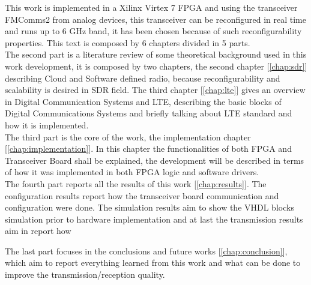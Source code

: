 This work is implemented in a Xilinx Virtex 7 FPGA and using the transceiver
FMComms2 from analog devices, this transceiver can be reconfigured in real time
and runs up to 6 GHz band, it has been chosen because of such reconfigurability
properties. This text is composed by 6 chapters divided in 5 parts.\\

The second part is a literature review of some theoretical background used in
this work development, it is composed by two chapters, the second chapter
[\ref{chap:sdr}] describing Cloud and Software defined radio, because
reconfigurability and scalability is desired in SDR field. The third chapter
[\ref{chap:lte}] gives an overview in Digital Communication Systems and LTE,
describing the basic blocks of Digital Communications Systems and briefly
talking about LTE standard and how it is implemented.\\

The third part is the core of the work, the implementation chapter
[\ref{chap:implementation}]. In this chapter the functionalities of both FPGA
and Transceiver Board shall be explained, the development will be described in
terms of how it was implemented in both FPGA logic and software drivers.\\

The fourth part reports all the results of this work
[\ref{chap:results}]. The configuration results report how the transceiver
board communication and configuration were done. The simulation results aim
to show the VHDL blocks simulation prior to hardware implementation and at last
the transmission results aim in report how

The last part focuses in the conclusions and future works [\ref{chap:conclusion}],
which aim to report everything learned from this work and what can be done to
improve the transmission/reception quality.
